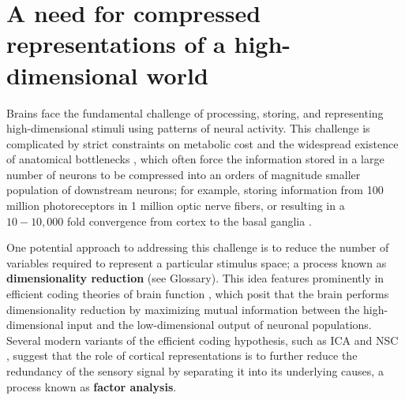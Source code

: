 %

\section{A need for compressed representations of a high-dimensional world}
\label{sec:introduction}

Brains face the fundamental challenge of 
processing, storing, and representing high-dimensional stimuli
using patterns of neural activity.
This challenge is complicated by strict constraints on metabolic cost
\citep{Lennie2003}
and the widespread existence of anatomical bottlenecks 
\citep{Kempermann2002,BarGad2003_Review,Babinsky1993,GanguliSompolinsky2012},
which often force the information stored in a large number of neurons
to be compressed into an orders of magnitude smaller population
of downstream neurons;
for example, storing information from 100 million photoreceptors 
in 1 million optic nerve fibers,
or resulting in a $10 - 10,000$ fold convergence from cortex to the basal ganglia
\citep{GanguliSompolinsky2012}.

One potential approach to addressing this challenge is to reduce the number
of variables required to represent a particular stimulus space;
a process known as \textbf{dimensionality reduction} (see Glossary).
This idea features prominently in 
efficient coding theories of brain function
\citep{Barlow1961,Barlow2001,Atick1992,Linsker1990},
which posit that the brain performs dimensionality reduction 
by maximizing mutual information between the
high-dimensional input and the low-dimensional output 
of neuronal populations.
Several modern variants of the efficient coding hypothesis,
such as \ac{ICA} \citep{BellSejnowski1997}
and \ac{NSC} \citep{Hoyer2002,Hoyer2004}, suggest that the role of cortical representations is to
further reduce the redundancy of the sensory signal 
by separating it into its underlying causes,
a process known as \textbf{factor analysis}.

